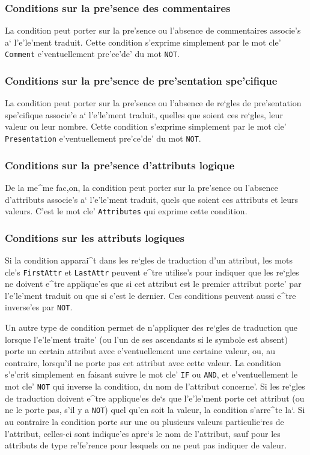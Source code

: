 {\subsubsection{Conditions sur la pre'sence des commentaires}

La condition peut porter sur la pre'sence ou l'absence de commentaires
associe's a` l'e'le'ment traduit. Cette condition s'exprime simplement par
le mot cle' {\tt Comment} e'ventuellement pre'ce'de' du mot {\tt NOT}.

\subsubsection{Conditions sur la pre'sence de pre'sentation spe'cifique}

La condition peut porter sur la pre'sence ou l'absence de re`gles de
pre'sentation spe'cifique associe'e a` l'e'le'ment traduit, quelles que
soient ces re`gles, leur valeur ou leur nombre. Cette condition s'exprime
simplement par le mot cle' {\tt Presentation} e'ventuellement pre'ce'de'
du mot {\tt NOT}.

\subsubsection{Conditions sur la pre'sence d'attributs logique}

De la me^me fac,on, la condition peut porter sur la pre'sence ou l'absence
d'attributs associe's a` l'e'le'ment traduit, quels que soient ces attributs
et leurs valeurs. C'est le mot cle' {\tt Attributes} qui exprime cette
condition.

\subsubsection{Conditions sur les attributs logiques}

Si la condition apparai^t dans les re`gles de traduction d'un attribut,
les mots cle's {\tt FirstAttr} et {\tt LastAttr} peuvent e^tre utilise's
pour indiquer que les re`gles ne doivent e^tre applique'es que si cet
attribut est le premier attribut porte' par l'e'le'ment traduit ou que si
c'est le dernier. Ces conditions peuvent aussi e^tre inverse'es par {\tt NOT}.

Un autre type de condition permet de n'appliquer des re`gles de
traduction que lorsque l'e'le'ment traite' (ou l'un de ses ascendants
si le symbole {\tt *} est absent) porte
un certain attribut avec e'ventuellement une certaine valeur, ou, au
contraire, lorsqu'il ne porte pas cet attribut avec cette valeur.
La condition s'e'crit simplement en faisant suivre le mot cle' {\tt IF}
ou {\tt AND}, et e'ventuellement le mot cle' {\tt NOT} qui
inverse la condition, du nom de l'attribut concerne'. Si les re`gles de
traduction doivent e^tre applique'es de`s que l'e'le'ment porte cet attribut
(ou ne le porte pas, s'il y a {\tt NOT}) quel qu'en soit la valeur, la
condition s'arre^te la`. Si au contraire la condition porte sur une ou
plusieurs valeurs particulie`res de l'attribut, celles-ci sont indique'es
apre`s le nom de l'attribut, sauf pour les attributs de type re'fe'rence
pour lesquels on ne peut pas indiquer de valeur.

}
